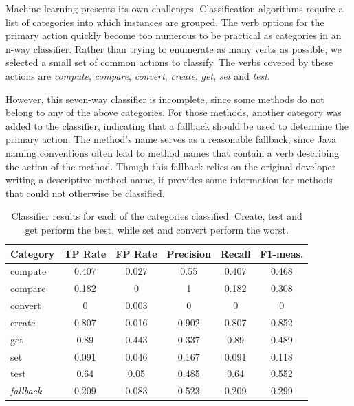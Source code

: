 \documentclass[preprint]{sigplanconf}
\begin{document}
Machine learning presents its own challenges. Classification algorithms require a list of categories into which instances are grouped. The verb options for the primary action quickly become too numerous to be practical as categories in an n-way classifier. Rather than trying to enumerate as many verbs as possible, we selected a small set of common actions to classify. The verbs covered by these actions are \emph{compute}, \emph{compare}, \emph{convert}, \emph{create}, \emph{get}, \emph{set} and \emph{test}.

However, this seven-way classifier is incomplete, since some methods do not belong to any of the above categories. For those methods, another category was added to the classifier, indicating that a fallback should be used to determine the primary action. The method's name serves as a reasonable fallback, since Java naming conventions often lead to method names that contain a verb describing the action of the method. Though this fallback relies on the original developer writing a descriptive method name, it provides some information for methods that could not otherwise be classified.

\begin{table}
	\begin{center}
		\begin{tabular}{ l | c | c | c | c | c }
		Category & TP Rate & FP Rate & Precision & Recall & F1-meas. \\
		\hline
		compute & 0.407 & 0.027 & 0.55 & 0.407 & 0.468 \\
		compare & 0.182 & 0 & 1 & 0.182 & 0.308 \\
		convert & 0 & 0.003 & 0 & 0 & 0 \\
		create & 0.807 & 0.016 & 0.902 & 0.807 & 0.852 \\
		get & 0.89 & 0.443 & 0.337 & 0.89 & 0.489 \\
		set & 0.091 & 0.046 & 0.167 & 0.091 & 0.118 \\
		test & 0.64 & 0.05 & 0.485 & 0.64 & 0.552 \\
		\emph{fallback} & 0.209 & 0.083 & 0.523 & 0.209 & 0.299
		\end{tabular}
	\end{center}
	\caption{Classifier results for each of the categories classified. Create, test and get perform the best, while set and convert perform the worst.}
	\label{table-classifier}
\end{table}
\end{document}
